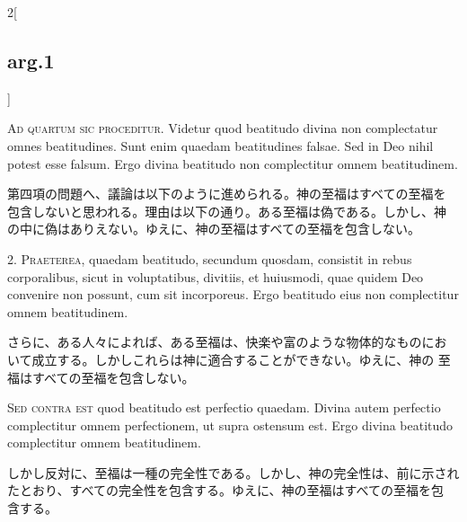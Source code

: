 \documentclass[paper=a4paper,fontsize=10pt,jafontsize=9pt,titlepage]{jlreq}
\begin{document}
\begin{paracol}{2}[\subsection{arg.1}]

{\Huge A}{\scshape d quartum sic proceditur}. Videtur quod beatitudo divina non
complectatur omnes beatitudines. Sunt enim quaedam beatitudines
falsae. Sed in Deo nihil potest esse falsum. Ergo divina beatitudo non
complectitur omnem beatitudinem.

\switchcolumn

第四項の問題へ、議論は以下のように進められる。神の至福はすべての至福を
包含しないと思われる。理由は以下の通り。ある至福は偽である。しかし、神
の中に偽はありえない。ゆえに、神の至福はすべての至福を包含しない。


2. {\scshape Praeterea}, quaedam beatitudo, secundum quosdam,
consistit in rebus corporalibus, sicut in voluptatibus, divitiis, et
huiusmodi, quae quidem Deo convenire non possunt, cum sit
incorporeus. Ergo beatitudo eius non complectitur omnem beatitudinem.

\switchcolumn

さらに、ある人々によれば、ある至福は、快楽や富のような物体的なものにお
 いて成立する。しかしこれらは神に適合することができない。ゆえに、神の
 至福はすべての至福を包含しない。

\switchcolumn*[\subsection{s.c.}]

{\scshape Sed contra est} quod beatitudo est perfectio quaedam. Divina autem
perfectio complectitur omnem perfectionem, ut supra ostensum est. Ergo
divina beatitudo complectitur omnem beatitudinem.

\switchcolumn

しかし反対に、至福は一種の完全性である。しかし、神の完全性は、前に示され
 たとおり、すべての完全性を包含する。ゆえに、神の至福はすべての至福を包
 含する。



\end{paracol}
\end{document}
